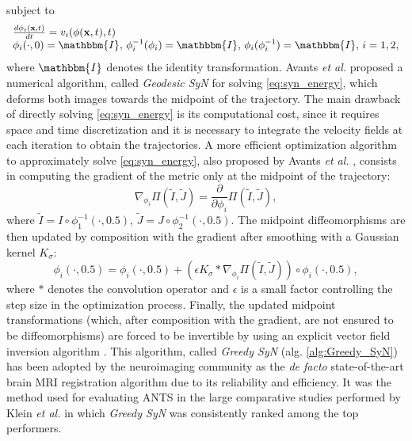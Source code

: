 subject to
\begin{equation}\label{eq:syn_energy_constraints}
    \begin{array}{l}
        \frac{d\phi_{i}(\mathbf{x}, t)}{dt} = v_{i}(\phi(\mathbf{x},t),t)\\
        \phi_{i}(\cdot, 0) = \mathbbm{I},\, \phi_{i}^{-1}(\phi_{i}) = \mathbbm{I},\, \phi_{i}(\phi_{i}^{-1}) = \mathbbm{I},\, i=1,2,
    \end{array}
\end{equation}
where $\mathbbm{I}$ denotes the identity transformation. Avants {\it et al.} \cite{Avants2006} proposed a numerical algorithm, called \textit{Geodesic SyN} for solving \eqref{eq:syn_energy}, which deforms both images towards the midpoint of the trajectory. The main drawback of directly solving \eqref{eq:syn_energy} is its computational cost, since it requires space and time discretization and it is necessary to integrate the velocity fields at each iteration to obtain the trajectories. A more efficient optimization algorithm to approximately solve \eqref{eq:syn_energy}, also proposed by Avants {\it et al.} \cite{Avants2008, Avants2011}, consists in computing the gradient of the metric only at the midpoint of the trajectory:
\begin{equation}\label{eq:grad_metric}
    \nabla_{\phi_{i}} \Pi(\tilde{I}, \tilde{J}) = \frac{\partial}{\partial \phi_{i}} \Pi \left( \tilde{I}, \tilde{J}\right),
\end{equation}
where $\tilde{I} = I \circ \phi_{1}^{-1}(\cdot, 0.5)$, $\tilde{J} = J \circ \phi_{2}^{-1}(\cdot, 0.5)$. The midpoint diffeomorphisms are then updated by composition with the gradient after smoothing with a Gaussian kernel $K_{\sigma}$:
\begin{equation}\label{eq:gsyn_update}
    \phi_{i}(\cdot, 0.5) = \phi_{i}(\cdot, 0.5) + \left( \epsilon K_{\sigma} \ast \nabla_{\phi_{i}} \Pi(\tilde{I}, \tilde{J}) \right) \circ \phi_{i}(\cdot, 0.5),
\end{equation}
where $\ast$ denotes the convolution operator and $\epsilon$ is a small factor controlling the step size in the optimization process. Finally, the updated midpoint transformations (which, after composition with the gradient, are not ensured to be diffeomorphisms) are forced to be invertible by using an explicit vector field inversion algorithm \cite{Chen2008}. This algorithm, called \textit{Greedy SyN} (alg. \ref{alg:Greedy_SyN}) has been adopted by the neuroimaging community as the \textit{de facto} state-of-the-art brain MRI registration algorithm due to its reliability and efficiency. It was the method used for evaluating ANTS \cite{Avants2011} in the large comparative studies performed by Klein {\it et al.} \cite{Klein2009, Klein2010} in which \textit{Greedy SyN} was consistently ranked among the top performers.

